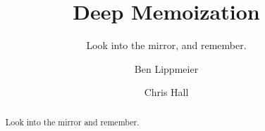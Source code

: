 \documentclass[acmsmall]{acmart}
\begin{document}
\title{Deep Memoization}
\subtitle{Look into the mirror, and remember.}

\author{Ben Lippmeier}
\author{Chris Hall}

\begin{abstract}
Look into the mirror and remember.
\end{abstract}

\maketitle
\makeatactive



\end{document}
